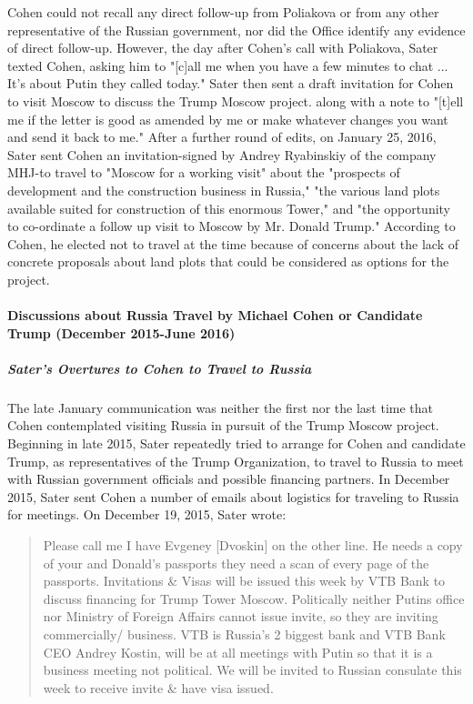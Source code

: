 Cohen could not recall any direct follow-up from Poliakova or from any other representative of the Russian government, nor did the Office identify any evidence of direct follow-up.
However, the day after Cohen's call with Poliakova, Sater texted Cohen, asking him to "[c]all me when you have a few minutes to chat ... It's about Putin they called today."%
Sater then sent a draft invitation for Cohen to visit Moscow to discuss the Trump Moscow project.%
along with a note to "[t]ell me if the letter is good as amended by me or make whatever changes you want and send it back to me."%
After a further round of edits, on January 25, 2016, Sater sent Cohen an invitation-signed by Andrey Ryabinskiy of the company MHJ-to travel to "Moscow for a working visit" about the "prospects of development and the construction business in Russia," "the various land plots available suited for construction of this enormous Tower," and "the opportunity to co-ordinate a follow up visit to Moscow by Mr. Donald Trump."%
According to Cohen, he elected not to travel at the time because of concerns about the lack of concrete proposals about land plots that could be considered as options for the project.%

\paragraph{Discussions about Russia Travel by Michael Cohen or Candidate Trump (December 2015-June 2016)}

\subparagraph{Sater's Overtures to Cohen to Travel to Russia}

The late January communication was neither the first nor the last time that Cohen contemplated visiting Russia in pursuit of the Trump Moscow project.
Beginning in late 2015, Sater repeatedly tried to arrange for Cohen and candidate Trump, as representatives of the Trump Organization, to travel to Russia to meet with Russian government officials and possible financing partners.
In December 2015, Sater sent Cohen a number of emails about logistics for traveling to Russia for meetings.%
On December 19, 2015, Sater wrote:

\begin{quote}
Please call me I have Evgeney [Dvoskin] on the other line.%
He needs a copy of your and Donald's passports they need a scan of every page of the passports.
Invitations \& Visas will be issued this week by VTB Bank to discuss financing for Trump Tower Moscow. Politically neither Putins office nor Ministry of Foreign Affairs cannot issue invite, so they are inviting commercially/ business.
VTB is Russia's 2 biggest bank and VTB Bank CEO Andrey Kostin, will be at all meetings with Putin so that it is a business meeting not political.
We will be invited to Russian consulate this week to receive invite \& have visa issued.%
\end{quote}

